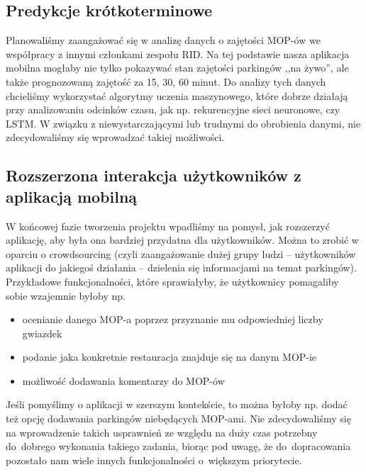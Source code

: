\subsection{Predykcje krótkoterminowe}
Planowaliśmy zaangażować się w analizę danych o zajętości MOP-ów we współpracy z innymi członkami zespołu RID. Na tej podstawie nasza aplikacja mobilna mogłaby nie tylko pokazywać stan zajętości parkingów ,,na żywo'', ale także prognozowaną zajętość za 15, 30, 60 minut. Do analizy tych danych chcieliśmy wykorzystać algorytmy uczenia maszynowego, które dobrze działają przy analizowaniu odcinków czasu, jak np. rekurencyjne sieci neuronowe, czy LSTM. W związku z niewystarczającymi lub trudnymi do obrobienia danymi, nie zdecydowaliśmy się wprowadzać takiej możliwości.
\subsection{Rozszerzona interakcja użytkowników z aplikacją mobilną}
W końcowej fazie tworzenia projektu wpadliśmy na pomysł, jak rozszerzyć aplikację, aby była ona bardziej przydatna dla użytkowników. Można to zrobić w oparciu o crowdsourcing (czyli zaangażowanie dużej grupy ludzi -- użytkowników aplikacji do jakiegoś działania -- dzielenia się informacjami na temat parkingów). Przykładowe funkcjonalności, które sprawiałyby, że użytkownicy pomagaliby sobie wzajemnie byłoby np.
\begin{itemize}
\item ocenianie danego MOP-a poprzez przyznanie mu odpowiedniej liczby gwiazdek
\item podanie jaka konkretnie restauracja znajduje się na danym MOP-ie
\item możliwość dodawania komentarzy do MOP-ów
\end{itemize}
Jeśli pomyślimy o aplikacji w szerszym kontekście, to można byłoby np. dodać też opcję dodawania parkingów niebędących MOP-ami.
Nie zdecydowaliśmy się na wprowadzenie takich usprawnień ze względu na duży czas potrzebny do~dobrego wykonania takiego zadania, biorąc pod uwagę, że do~dopracowania pozostało nam wiele innych funkcjonalności o~większym priorytecie.
